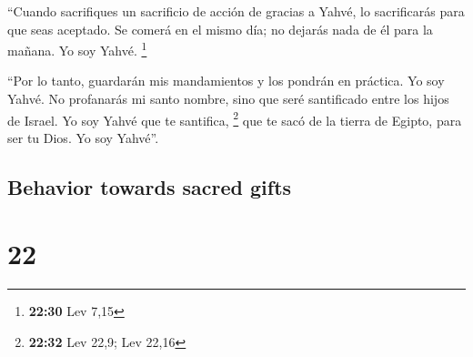 \begin{paracol}{2}
 ``Cuando sacrifiques un sacrificio de acción de gracias
a Yahvé, lo sacrificarás para que seas aceptado.  Se
comerá en el mismo día; no dejarás nada de él para la mañana. Yo soy
Yahvé. \footnote{\textbf{22:30} Lev 7,15}

 ``Por lo tanto, guardarán mis mandamientos y los pondrán
en práctica. Yo soy Yahvé.  No profanarás mi santo
nombre, sino que seré santificado entre los hijos de Israel. Yo soy
Yahvé que te santifica, \footnote{\textbf{22:32} Lev 22,9; Lev 22,16}
 que te sacó de la tierra de Egipto, para ser tu Dios. Yo
soy Yahvé''.

\switchcolumn
\begin{otherlanguage}{english}

\hypertarget{behavior-towards-sacred-gifts}{%
\subsection{Behavior towards sacred
gifts}\label{behavior-towards-sacred-gifts}}

\hypertarget{section-43}{%
\section{22}\label{section-43}}


\end{otherlanguage}
\end{paracol}
